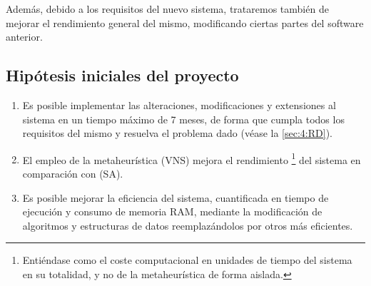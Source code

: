 Además, debido a los requisitos del nuevo sistema, trataremos también de mejorar el rendimiento general del mismo, modificando ciertas partes del software anterior.

\subsection{Hipótesis iniciales del proyecto}
\label{sec:Hipotesis}
\begin{enumerate}[label={H\arabic*}]
	\item \label{H1} Es posible implementar las alteraciones, modificaciones y extensiones al sistema en un tiempo máximo de 7 meses, de forma que cumpla todos los requisitos del mismo y resuelva el problema dado (véase la \autoref{sec:4:RD}).
	\item \label{H2} El empleo de la metaheurística \vns{} (VNS) mejora el rendimiento%
	\footnote{Entiéndase como el coste computacional en unidades de tiempo del sistema en su totalidad, y no de la metaheurística de forma aislada.}
	del sistema en comparación con \sa{} (SA).
	\item \label{H3} Es posible mejorar la eficiencia del sistema, cuantificada en tiempo de ejecución y consumo de memoria RAM, mediante la modificación de algoritmos y estructuras de datos reemplazándolos por otros más eficientes.
\end{enumerate}

%
%
\glsaddall
\printglossary[title={Definiciones, acrónimos y abreviaturas}, nonumberlist]
%
%
%